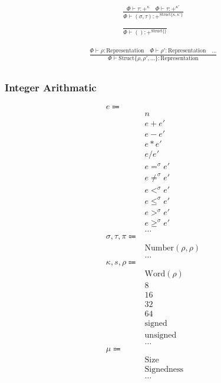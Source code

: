 \documentclass {article}
\begin{document}
\begin{gather*}
\frac
{\Phi \vdash \tau : +^{\kappa} \quad \Phi \vdash \tau : +^{\kappa'} }
{\Phi \vdash (\sigma, \tau) : +^{\text{Struct} \{ \kappa,\kappa'\}}} \\
\\
\frac
{}
{\Phi \vdash () : +^{\text{Struct} \{\}}}
\end{gather*}


\begin{gather*}
\frac
{\Phi \vdash \rho : \text{Representation} \quad \Phi \vdash \rho' : \text{Representation} \quad \dots}
{\Phi \vdash \text{Struct} \{ \rho, \rho', \dots \} : \text{Representation} } \\
\end{gather*}

\subsubsection{Integer Arithmatic}
\begin{align*}
e \Coloneqq & \\
& n \tag{Numeric Literal} \\
& e + e' \tag{Addition} \\
& e - e' \tag{Subtraction} \\
& e * e' \tag{Multiplication} \\
& e / e' \tag{Division} \\
& e =^\sigma e' \tag {Equality} \\
& e \neq^\sigma e' \tag {Inequality} \\
& e <^\sigma e' \tag {Less Then} \\
& e \leq^\sigma e' \tag {Less Then Equal} \\
& e >^\sigma e' \tag {Greater Then} \\
& e \geq^\sigma e' \tag {Greater Then Equal} \\
& \dots \\
\sigma, \tau, \pi \Coloneqq & \\
& \text{Number} (\rho, \rho) \tag{Number} \\
& \dots \\
\kappa, s, \rho \Coloneqq & \\
& \text{Word} (\rho) \tag{Word Representation} \\
& 8 \tag{Byte Size} \\
& 16 \tag{Short Size} \\
& 32 \tag{Int Size} \\
& 64 \tag{Long Size} \\
& \text{signed} \tag{Signed} \\
& \text{unsigned} \tag{Unsigned} \\
& \dots \\
\mu \Coloneqq & \\
& \text{Size} \\
& \text{Signedness} \\
& \dots
\end{align*}
\end{document}
